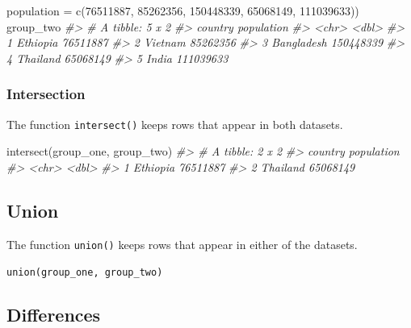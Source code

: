 \documentclass[
]{book}
\newenvironment{Shaded}{\begin{snugshade}}{\end{snugshade}}
\newcommand{\AttributeTok}[1]{\textcolor[rgb]{0.77,0.63,0.00}{#1}}
\newcommand{\CommentTok}[1]{\textcolor[rgb]{0.56,0.35,0.01}{\textit{#1}}}
\newcommand{\DecValTok}[1]{\textcolor[rgb]{0.00,0.00,0.81}{#1}}
\newcommand{\FunctionTok}[1]{\textcolor[rgb]{0.00,0.00,0.00}{#1}}
\newcommand{\NormalTok}[1]{#1}
\begin{document}
\begin{Shaded}
\begin{Highlighting}[]
       \AttributeTok{population =} \FunctionTok{c}\NormalTok{(}\DecValTok{76511887}\NormalTok{, }\DecValTok{85262356}\NormalTok{, }\DecValTok{150448339}\NormalTok{, }\DecValTok{65068149}\NormalTok{, }\DecValTok{111039633}\NormalTok{))}
\NormalTok{group\_two}
\CommentTok{\#\textgreater{} \# A tibble: 5 x 2}
\CommentTok{\#\textgreater{}   country    population}
\CommentTok{\#\textgreater{}   \textless{}chr\textgreater{}           \textless{}dbl\textgreater{}}
\CommentTok{\#\textgreater{} 1 Ethiopia     76511887}
\CommentTok{\#\textgreater{} 2 Vietnam      85262356}
\CommentTok{\#\textgreater{} 3 Bangladesh  150448339}
\CommentTok{\#\textgreater{} 4 Thailand     65068149}
\CommentTok{\#\textgreater{} 5 India       111039633}
\end{Highlighting}
\end{Shaded}

\hypertarget{intersection}{%
\subsubsection{Intersection}\label{intersection}}

The function \texttt{intersect()} keeps rows that appear in both datasets.

\begin{Shaded}
\begin{Highlighting}[]
\FunctionTok{intersect}\NormalTok{(group\_one, group\_two)}
\CommentTok{\#\textgreater{} \# A tibble: 2 x 2}
\CommentTok{\#\textgreater{}   country  population}
\CommentTok{\#\textgreater{}   \textless{}chr\textgreater{}         \textless{}dbl\textgreater{}}
\CommentTok{\#\textgreater{} 1 Ethiopia   76511887}
\CommentTok{\#\textgreater{} 2 Thailand   65068149}
\end{Highlighting}
\end{Shaded}

\hypertarget{union}{%
\subsection{Union}\label{union}}

The function \texttt{union()} keeps rows that appear in either of the datasets.

\texttt{union(group\_one,\ group\_two)}

\hypertarget{differences}{%
\subsection{Differences}\label{differences}}
\end{document}

